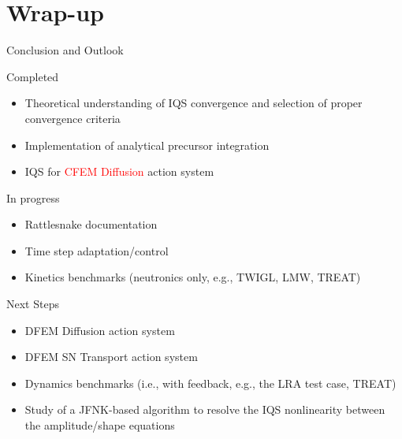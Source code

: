 \documentclass[8pt]{beamer}
\newcommand{\bi}{\begin{itemize}}
\newcommand{\ei}{\end{itemize}}
\newcommand{\tcr}[1]{\textcolor{red}{#1}}
\begin{document}

%
%


%


\section{Wrap-up}

\begin{frame}{Conclusion and Outlook}

\begin{block}{Completed}
\bi
\item Theoretical understanding of IQS convergence and selection of proper convergence criteria
\item Implementation of analytical precursor integration
\item IQS for \tcr{CFEM Diffusion} action system
\ei
\end{block}

\begin{block}{In progress}
\bi
\item Rattlesnake documentation
\item Time step adaptation/control
\item Kinetics benchmarks (neutronics only, e.g., TWIGL, LMW, TREAT)
\ei
\end{block}
\begin{block}{Next Steps}
\bi
\item DFEM Diffusion action system
\item DFEM SN Transport action system
\item Dynamics benchmarks (i.e., with feedback, e.g., the LRA test case, TREAT)
\item Study of a JFNK-based algorithm to resolve the IQS nonlinearity between the amplitude/shape equations
\ei
\end{block}

\end{frame}
\end{document}
